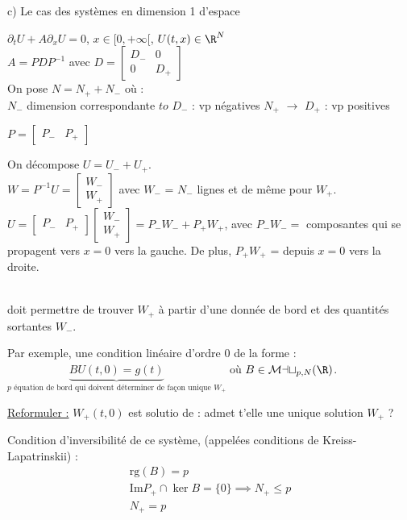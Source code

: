 \documentclass[12pt,a4paper]{article}
\begin{document}
	c) Le cas des systèmes en dimension 1 d'espace
	
	$\partial_t U+A\partial_x U = 0$, $x \in [0,+\infty[$, $U(t,x) \in \R^N$\\
	$A = PDP^{-1}$ avec $D = \begin{bmatrix}
		D_- & 0 \\ 
		0 & D_+
	\end{bmatrix}$\\
	On pose $N = N_++N_-$ où :\\
	$N_-$ dimension correspondante  $to$ $D_-$ : vp négatives
	$N_+$ $\to$ $D_+$ : vp positives
	
	$P = \begin{bmatrix}
		P_- & P_+
	\end{bmatrix}$
	
	On décompose $U = U_-+U_+$.\\
	$W = P^{-1} U = \begin{bmatrix}
		W_-\\
		W_+
	\end{bmatrix}$ avec $W_-$ = $N_-$ lignes et de même pour $W_+$.\\
	$U = \begin{bmatrix}
		P_- & P_+
	\end{bmatrix}\begin{bmatrix}
		W_- \\
		W_+
	\end{bmatrix} = P_- W_- + P_+W_+$, avec $P_-W_- = $ composantes qui se propagent vers $x=0$ vers la gauche. De plus, $P_+W_+$ = depuis $x=0$ vers la droite.
	
	\\
	doit permettre de trouver $W_+$ à partir d'une donnée de bord et des quantités sortantes $W_-$.
	
	Par exemple, une condition linéaire d'ordre 0 de la forme : $\underbrace{BU(t,0) = g(t)}_{\text{$p$ équation de bord qui doivent déterminer de façon unique }W_+}$ où $B \in \mathcal{Mat}_{p,N}(\R)$.
	
	\underline{Reformuler :} $W_+(t,0)$ est solutio de  :  admet t'elle une unique solution $W_+$ ?
	
	Condition d'inversibilité de ce système, (appelées conditions de Kreiss-Lapatrinskii) :
	\[
	\begin{aligned}
		\mathrm{rg}(B) = p\\
		\mathrm{Im} P_+ \cap \ker B = \{0\} \implies N_+ \leq p\\
		N_+ = p
	\end{aligned}
	\]
	
\end{document}

